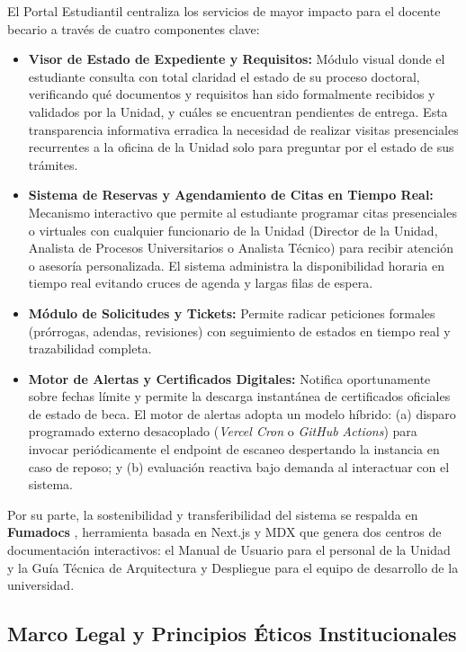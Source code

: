 El Portal Estudiantil centraliza los servicios de mayor impacto para el docente becario a través de cuatro componentes clave:
\begin{itemize}[leftmargin=*]
    \item \textbf{Visor de Estado de Expediente y Requisitos:} Módulo visual donde el estudiante consulta con total claridad el estado de su proceso doctoral, verificando qué documentos y requisitos han sido formalmente recibidos y validados por la Unidad, y cuáles se encuentran pendientes de entrega. Esta transparencia informativa erradica la necesidad de realizar visitas presenciales recurrentes a la oficina de la Unidad solo para preguntar por el estado de sus trámites.
    \item \textbf{Sistema de Reservas y Agendamiento de Citas en Tiempo Real:} Mecanismo interactivo que permite al estudiante programar citas presenciales o virtuales con cualquier funcionario de la Unidad (Director de la Unidad, Analista de Procesos Universitarios o Analista Técnico) para recibir atención o asesoría personalizada. El sistema administra la disponibilidad horaria en tiempo real evitando cruces de agenda y largas filas de espera.
    \item \textbf{Módulo de Solicitudes y Tickets:} Permite radicar peticiones formales (prórrogas, adendas, revisiones) con seguimiento de estados en tiempo real y trazabilidad completa.
    \item \textbf{Motor de Alertas y Certificados Digitales:} Notifica oportunamente sobre fechas límite y permite la descarga instantánea de certificados oficiales de estado de beca. El motor de alertas adopta un modelo híbrido: (a) disparo programado externo desacoplado (\textit{Vercel Cron} o \textit{GitHub Actions}) para invocar periódicamente el endpoint de escaneo despertando la instancia en caso de reposo; y (b) evaluación reactiva bajo demanda al interactuar con el sistema.
\end{itemize}

Por su parte, la sostenibilidad y transferibilidad del sistema se respalda en \textbf{Fumadocs} \cite{fumadocs_docs}, herramienta basada en Next.js y MDX que genera dos centros de documentación interactivos: el Manual de Usuario para el personal de la Unidad y la Guía Técnica de Arquitectura y Despliegue para el equipo de desarrollo de la universidad.

\subsection{Marco Legal y Principios Éticos Institucionales}

